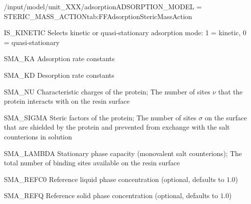 \begin{condsubgroup}{/input/model/unit\_XXX/adsorption}{ADSORPTION\_MODEL = STERIC\_MASS\_ACTION}{tab:FFAdsorptionStericMassAction}
  \begin{dataset}[type=int,range={$\{ 0,1 \}$},length=1]{IS\_KINETIC}
    Selects kinetic or quasi-stationary adsorption mode: 1 = kinetic, 0 = quasi-stationary
  \end{dataset}
  \begin{dataset}[unit=\si{\raiseto{3}\metre\of{MP}\per\raiseto{3}\metre\of{SP}\per\second}, type=double,range={$\geq 0$},length={\texttt{NCOMP}}]{SMA\_KA}
    Adsorption rate constants
  \end{dataset}
  \begin{dataset}[unit=\si{\per\second}, type=double,range={$\geq 0$},length={\texttt{NCOMP}}]{SMA\_KD}
    Desorption rate constants
  \end{dataset}
  \begin{dataset}[type=double,range={$\geq 0$},length={\texttt{NCOMP}}]{SMA\_NU}
    Characteristic charges of the protein; The number of sites $\nu$ that the protein interacts with on the resin surface
  \end{dataset}
  \begin{dataset}[type=double,range={$\geq 0$},length={\texttt{NCOMP}}]{SMA\_SIGMA}
    Steric factors of the protein; The number of sites $\sigma$ on the surface that are shielded by the protein and prevented from exchange with the salt counterions in solution
  \end{dataset}
  \begin{dataset}[unit=\si{\mol\per\cubic\metre\of{SP}}, type=double,range={$\geq 0$},length={1}]{SMA\_LAMBDA}
    Stationary phase capacity (monovalent salt counterions); The total number of binding sites available on the resin surface 
  \end{dataset}
  \begin{dataset}[unit=\si{\mol\per\raiseto{3}\metre\of{MP}}, type=double,range={$> 0$},length={1}]{SMA\_REFC0}
    Reference liquid phase concentration (optional, defaults to $1.0$)
  \end{dataset}
  \begin{dataset}[unit=\si{\mol\per\raiseto{3}\metre\of{SP}}, type=double,range={$> 0$},length={1}]{SMA\_REFQ}
    Reference solid phase concentration (optional, defaults to $1.0$) 
  \end{dataset}
\end{condsubgroup}

